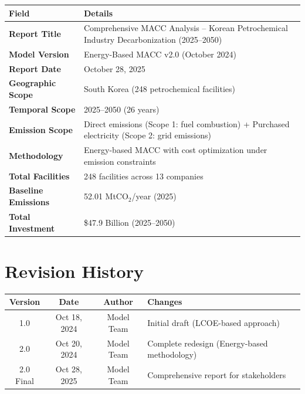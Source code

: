 \documentclass[11pt,a4paper]{report}
\newcommand{\mtco}{MtCO$_2$}
\begin{document}
\begin{table}[H]
\centering
\begin{tabular}{p{5cm}p{10cm}}
\toprule
\textbf{Field} & \textbf{Details} \\
\midrule
\textbf{Report Title} & Comprehensive MACC Analysis -- Korean Petrochemical Industry Decarbonization (2025--2050) \\
\textbf{Model Version} & Energy-Based MACC v2.0 (October 2024) \\
\textbf{Report Date} & October 28, 2025 \\
\textbf{Geographic Scope} & South Korea (248 petrochemical facilities) \\
\textbf{Temporal Scope} & 2025--2050 (26 years) \\
\textbf{Emission Scope} & Direct emissions (Scope 1: fuel combustion) + Purchased electricity (Scope 2: grid emissions) \\
\textbf{Methodology} & Energy-based MACC with cost optimization under emission constraints \\
\textbf{Total Facilities} & 248 facilities across 13 companies \\
\textbf{Baseline Emissions} & 52.01 \mtco/year (2025) \\
\textbf{Total Investment} & \$47.9 Billion (2025--2050) \\
\bottomrule
\end{tabular}
\end{table}

\vspace{1cm}

\section*{Revision History}

\begin{table}[H]
\centering
\begin{tabular}{cccp{8cm}}
\toprule
\textbf{Version} & \textbf{Date} & \textbf{Author} & \textbf{Changes} \\
\midrule
1.0 & Oct 18, 2024 & Model Team & Initial draft (LCOE-based approach) \\
2.0 & Oct 20, 2024 & Model Team & Complete redesign (Energy-based methodology) \\
2.0 Final & Oct 28, 2025 & Model Team & Comprehensive report for stakeholders \\
\bottomrule
\end{tabular}
\end{table}
\end{document}
